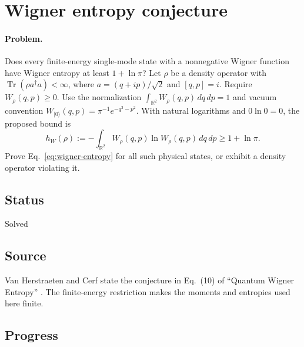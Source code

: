 \section{Wigner entropy conjecture}
\label{sec:op_8682c870bea8ab4e}

\paragraph{Problem.}
Does every finite-energy single-mode state with a nonnegative Wigner function have Wigner entropy at least $1+\ln\pi$?
Let $\rho$ be a density operator with $\operatorname{Tr}(\rho a^\dagger a)<\infty$, where $a=(q+ip)/\sqrt2$ and $[q,p]=i$. Require $W_\rho(q,p)\geq0$. Use the normalization $\int_{\mathbb R^2}W_\rho(q,p)\,dq\,dp=1$ and vacuum convention $W_{|0\rangle}(q,p)=\pi^{-1}e^{-q^2-p^2}$. With natural logarithms and $0\ln0=0$, the proposed bound is
\begin{equation}
 h_W(\rho):=-\int_{\mathbb R^2}W_\rho(q,p)\ln W_\rho(q,p)\,dq\,dp
 \geq1+\ln\pi.
 \label{eq:wigner-entropy}
\end{equation}
Prove Eq.~\eqref{eq:wigner-entropy} for all such physical states, or exhibit a density operator violating it.

\subsection*{Status}

Solved

\subsection*{Source}

Van Herstraeten and Cerf state the conjecture in Eq.~(10) of ``Quantum Wigner Entropy'' . The finite-energy restriction makes the moments and entropies used here finite.

\subsection*{Progress}

